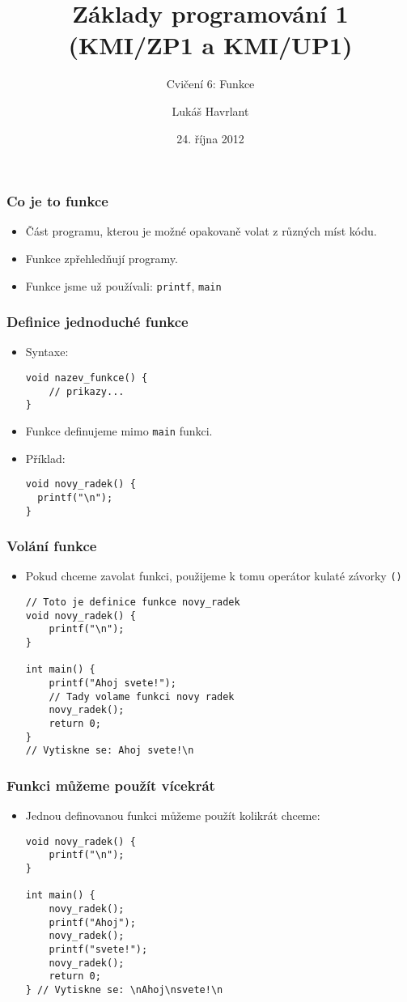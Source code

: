\documentclass{beamer}
\title{Základy programování 1 (KMI/ZP1 a KMI/UP1)}
\subtitle{Cvičení 6: Funkce}
\author{Lukáš Havrlant}
\date{24. října 2012}
\institute{Univerzita Palackého}
\newenvironment{itemizex}%
  {\large \begin{itemize}%
    \setlength{\itemsep}{8pt}%
    \setlength{\parskip}{8pt}}%
  {\end{itemize}}
\begin{document}
\begin{frame}[t,plain]
\titlepage
\end{frame}


\begin{frame}[t,fragile]\frametitle{Co je to funkce} 
    \begin{itemizex}
        \item Část programu, kterou je možné opakovaně volat z různých míst kódu.
        \item Funkce zpřehledňují programy.
        \item Funkce jsme už používali: \texttt{printf}, \texttt{main}
    \end{itemizex}
\end{frame}


\begin{frame}[t,fragile]\frametitle{Definice jednoduché funkce} 
    \begin{itemizex}
        \item Syntaxe:
        \begin{verbatim} 
void nazev_funkce() {
    // prikazy...
}
        \end{verbatim}
        \item Funkce definujeme mimo \texttt{main} funkci.
        \item Příklad:
        \begin{verbatim} 
void novy_radek() {
  printf("\n");
}
        \end{verbatim}
    \end{itemizex}
\end{frame}


\begin{frame}[t,fragile]\frametitle{Volání funkce} 
    \begin{itemize}
        \item Pokud chceme zavolat funkci, použijeme k tomu operátor kulaté závorky \texttt{()}
        \begin{verbatim} 
// Toto je definice funkce novy_radek
void novy_radek() {
    printf("\n");
}

int main() {
    printf("Ahoj svete!"); 
    // Tady volame funkci novy radek
    novy_radek(); 
    return 0;         
}
// Vytiskne se: Ahoj svete!\n
        \end{verbatim}
    \end{itemize}
\end{frame}


\begin{frame}[t,fragile]\frametitle{Funkci můžeme použít vícekrát} 
    \begin{itemize}
        \item Jednou definovanou funkci můžeme použít kolikrát chceme:
        \begin{verbatim} 
void novy_radek() {
    printf("\n");
}

int main() {
    novy_radek();
    printf("Ahoj");
    novy_radek();
    printf("svete!");
    novy_radek();
    return 0;
} // Vytiskne se: \nAhoj\nsvete!\n
        \end{verbatim}
    \end{itemize}
\end{frame}
\end{document}

